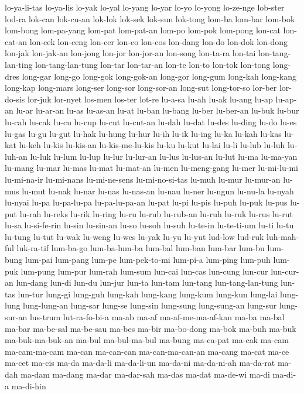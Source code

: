 {lo-ya-li-tas lo-ya-lis lo-yak lo-yal lo-yang lo-yar lo-yo lo-yong
lo-ze-nge lob-ster lod-ra lok-can lok-cu-an lok-lok lok-sek lok-sun
lok-tong lom-ba lom-bar lom-bok lom-bong lom-pa-yang lom-pat lom-pat-an
lom-po lom-pok lom-pong lon-cat lon-cat-an lon-cek lon-ceng lon-cer lon-co
lon-cos lon-dang lon-do lon-dok lon-dong lon-jak lon-jak-an lon-jong
lon-jor lon-jor-an lon-song lon-ta-ra lon-tai lon-tang-lan-ting
lon-tang-lan-tung lon-tar lon-tar-an lon-te lon-to lon-tok lon-tong
long-dres long-gar long-go long-gok long-gok-an long-gor long-gum long-kah
long-kang long-kap long-mars long-ser long-sor long-sor-an long-sut
long-tor-so lor-ber lor-do-sis lor-juk lor-nyet los-men los-ter lot-re
lu-a-sa lu-ah lu-ak lu-ang lu-ap lu-ap-an lu-ar lu-ar-an lu-as lu-as-an
lu-at lu-ban lu-bang lu-ber lu-ber-an lu-buk lu-bur lu-cah lu-cak lu-cu
lu-cup lu-cut lu-cut-an lu-dah lu-dat lu-des lu-ding lu-do lu-es lu-gas
lu-gu lu-gut lu-hak lu-hung lu-hur lu-ih lu-ik lu-ing lu-ka lu-kah lu-kas
lu-kat lu-keh lu-kis lu-kis-an lu-kis-me-lu-kis lu-ku lu-kut lu-lai lu-li
lu-lub lu-luh lu-luh-an lu-luk lu-lum lu-lup lu-lur lu-lur-an lu-lus
lu-lus-an lu-lut lu-ma lu-ma-yan lu-mang lu-mar lu-mas lu-mat lu-mat-an
lu-men lu-meng-gang lu-mer lu-mi-lu-mi lu-mi-na-ir lu-mi-nans
lu-mi-ne-sens lu-mi-no-si-tas lu-muh lu-mur lu-mur-an lu-mus lu-mut lu-nak
lu-nar lu-nas lu-nas-an lu-nau lu-ner lu-ngun lu-nu-la lu-nyah lu-nyai
lu-pa lu-pa-lu-pa lu-pa-lu-pa-an lu-pat lu-pi lu-pis lu-puh lu-puk lu-pus
lu-put lu-rah lu-reks lu-rik lu-ring lu-ru lu-rub lu-rub-an lu-ruh lu-ruk
lu-rus lu-rut lu-sa lu-si-fe-rin lu-sin lu-sin-an lu-so lu-soh lu-suh
lu-te-in lu-te-ti-um lu-ti lu-tu lu-tung lu-tut lu-wak lu-weng lu-wes
lu-yak lu-yu lu-yut lud-low lud-ruk luh-mah-ful luk-ra-tif lum-ba-go
lum-ba-lum-ba lum-bal lum-ban lum-bar lum-bu lum-bung lum-pai lum-pang
lum-pe lum-pek-to-mi lum-pi-a lum-ping lum-puh lum-puk lum-pung lum-pur
lum-rah lum-sum lun-cai lun-cas lun-cung lun-cur lun-cur-an lun-dang
lun-di lun-du lun-jur lun-ta lun-tam lun-tang lun-tang-lan-tung lun-tas
lun-tur lung-gi lung-guh lung-kah lung-kang lung-kum lung-kun lung-lai
lung-lung lung-lung-an lung-sar lung-se lung-sin lung-sung lung-sung-an
lung-sur lung-sur-an lus-trum lut-ra-fo-bi-a ma-ab ma-af
ma-af-me-ma-af-kan ma-ba ma-bal ma-bar ma-be-sal ma-be-sau ma-bes ma-bir
ma-bo-dong ma-bok ma-buh ma-buk ma-buk-ma-buk-an ma-bul ma-bul-ma-bul
ma-bung ma-ca-pat ma-cak ma-cam ma-cam-ma-cam ma-can ma-can-can
ma-can-ma-can-an ma-cang ma-cat ma-ce ma-cet ma-cis ma-da ma-da-li
ma-da-li-un ma-da-ni ma-da-ni-ah ma-da-rat ma-dah ma-dam ma-dang ma-dar
ma-dar-sah ma-das ma-dat ma-de-wi ma-di ma-di-a ma-di-hin
}
